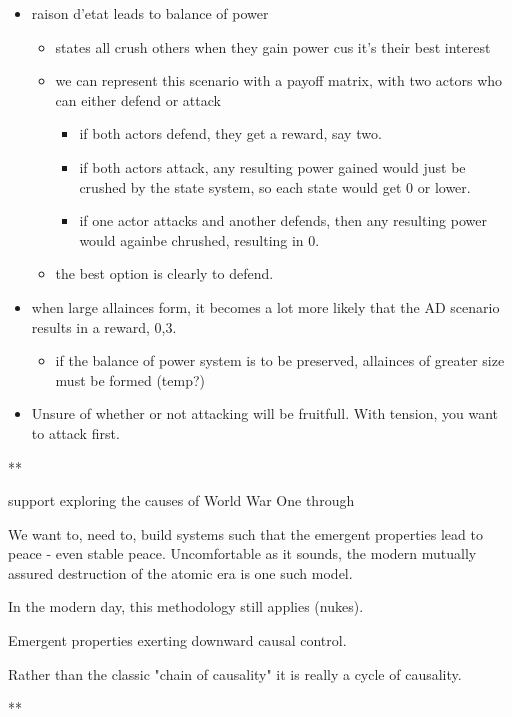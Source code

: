 \documentclass[letterpaper]{article}
\begin{document}
\begin{itemize}
\item raison d'etat leads to balance of power

\begin{itemize}
\item states all crush others when they gain power cus it's their best
interest
\item we can represent this scenario with a payoff matrix, with two actors
who can either defend or attack

\begin{itemize}
\item if both actors defend, they get a reward, say two.
\item if both actors attack, any resulting power gained would just be
crushed by the state system, so each state would get 0 or lower.
\item if one actor attacks and another defends, then any resulting power
would againbe chrushed, resulting in 0.
\end{itemize}

\item the best option is clearly to defend.
\end{itemize}

\item when large allainces form, it becomes a lot more likely that the AD
scenario results in a reward, 0,3.

\begin{itemize}
\item if the balance of power system is to be preserved, allainces of
greater size must be formed (temp?)
\end{itemize}

\item Unsure of whether or not attacking will be fruitfull. With tension,
you want to attack first.
\end{itemize}

**

support exploring the causes of World War One through

We want to, need to, build systems such that the emergent properties
lead to peace - even stable peace. Uncomfortable as it sounds, the
modern mutually assured destruction of the atomic era is one such model.

In the modern day, this methodology still applies (nukes).

Emergent properties exerting downward causal control.

Rather than the classic "chain of causality" it is really a cycle of
causality.

**
\end{document}
